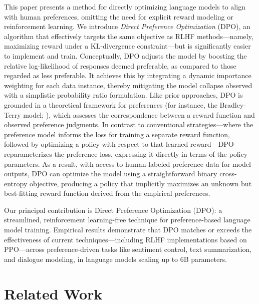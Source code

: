 This paper presents a method for directly optimizing language models to align with human preferences, omitting the need for explicit reward modeling or reinforcement learning. We introduce \textit{Direct Preference Optimization} (DPO), an algorithm that effectively targets the same objective as RLHF methods—namely, maximizing reward under a KL-divergence constraint—but is significantly easier to implement and train. Conceptually, DPO adjusts the model by boosting the relative log-likelihood of responses deemed preferable, as compared to those regarded as less preferable. It achieves this by integrating a dynamic importance weighting for each data instance, thereby mitigating the model collapse observed with a simplistic probability ratio formulation. Like prior approaches, DPO is grounded in a theoretical framework for preferences (for instance, the Bradley-Terry model; \cite{bradley1952rankanalysis}), which assesses the correspondence between a reward function and observed preference judgments. In contrast to conventional strategies—where the preference model informs the loss for training a separate reward function, followed by optimizing a policy with respect to that learned reward—DPO reparameterizes the preference loss, expressing it directly in terms of the policy parameters. As a result, with access to human-labeled preference data for model outputs, DPO can optimize the model using a straightforward binary cross-entropy objective, producing a policy that implicitly maximizes an unknown but best-fitting reward function derived from the empirical preferences.

Our principal contribution is Direct Preference Optimization (DPO): a streamlined, reinforcement learning-free technique for preference-based language model training. Empirical results demonstrate that DPO matches or exceeds the effectiveness of current techniques—including RLHF implementations based on PPO—across preference-driven tasks like sentiment control, text summarization, and dialogue modeling, in language models scaling up to 6B parameters.

\section{Related Work}

